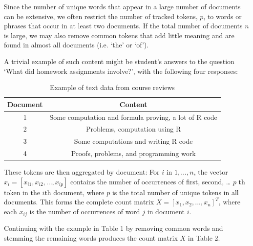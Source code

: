 \documentclass[12pt]{article}
\begin{document}
Since the number of unique words that appear in a large number of
documents can be extensive, we often restrict the number of tracked
tokens, $p$, to words or phrases that occur in at least two documents. If the total number of documents $n$ is large, we may also
remove common tokens that add little meaning and are found in almost all
documents (i.e. `the' or `of').

A trivial example of such content might be student's answers to the
question `What did homework assignments involve?', with the following four responses:

\begin{table}[!hbpt]
\caption{Example of text data from course reviews} \label{tab:title}
\begin{center}
\begin{tabular} {c c}
\textbf{Document} & \textbf{Content} \\
\hline
1 & Some computation and formula proving, a lot of R code \\
2 & Problems, computation using R \\
3 & Some computations and writing R code\\
4 & Proofs, problems, and programming work \\
\end{tabular}
\end{center}
\end{table}

These tokens are then aggregated by document: For $i$ in $1,...,n$,
the vector $x_i = [x_{i1}, x_{i2}, ... , x_{ip}]$ contains the
number of occurrences of first, second, \ldots{} $p$ th token in the
$i$th document, where $p$ is the total number of unique tokens in all
documents. This forms the complete count matrix $X = [x_1, x_2,..., x_n]^{T}$, where each $x_{ij}$
is the number of occurrences of word $j$ in document $i$.


Continuing with the example in Table 1 by removing common words and stemming the remaining words produces the count matrix $X$ in Table 2. 

\begin{table}[!hbpt]
\caption{Creating a word-count matrix from text}
\begin{center}
\end{center}
\end{table} 
\end{document}
